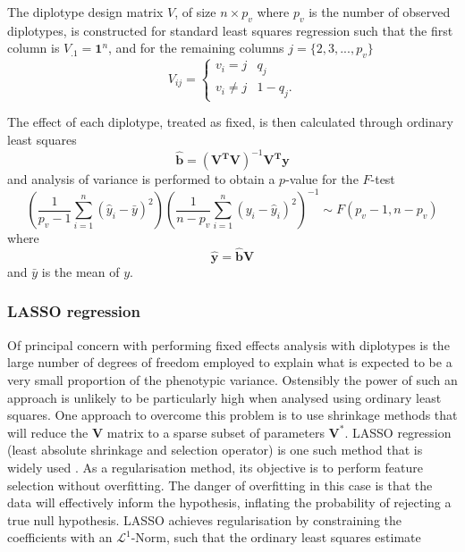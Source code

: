 The diplotype design matrix $V$, of size $n \times p_{v}$ where $p_{v}$ is the number of observed diplotypes, is constructed for standard least squares regression such that the first column is $V_{.1} = \mathbf{1}^n$, and for the remaining columns $j = \{2, 3, ..., p_{v}\}$
\begin{equation}
V_{ij} = \left\{
\begin{array}{ll}
v_{i} = j & q_{j} \\
v_{i} \neq j & 1 - q_{j}.
\end{array}\right.
\end{equation}

The effect of each diplotype, treated as fixed, is then calculated through ordinary least squares
\begin{equation}
\mathbf{\hat{b}} = (\mathbf{V^{T}V})^{-1}\mathbf{V^{T}y}
\end{equation}
and analysis of variance is performed to obtain a $p$-value for the $F$-test
\begin{equation}
\left (
  \frac{1}{p_{v} - 1} \sum^{n}_{i = 1} (\hat{y}_{i} - \bar{y})^{2} 
\right )
\left (
  \frac{1} {n - p_{v}} \sum^{n}_{i = 1} (y_{i} - \hat{y}_{i})^{2}
\right )^{-1}
\sim F(p_{v}-1, n - p_{v})
\label{eq:ftest}
\end{equation}
where
\begin{equation}
\mathbf{\hat{y}} = \mathbf{\hat{b}V}
\end{equation}
and $\bar{y}$ is the mean of $y$.


\subsubsection{LASSO regression}
\label{sec:dip_lasso}

Of principal concern with performing fixed effects analysis with diplotypes is the large number of degrees of freedom employed to explain what is expected to be a very small proportion of the phenotypic variance. Ostensibly the power of such an approach is unlikely to be particularly high when analysed using ordinary least squares. One approach to overcome this problem is to use shrinkage methods that will reduce the $\mathbf{V}$ matrix to a sparse subset of parameters $\mathbf{V^{*}}$. LASSO regression (least absolute shrinkage and selection operator) is one such method that is widely used \citep{Tibshirani1996}. As a regularisation method, its objective is to perform feature selection without overfitting. The danger of overfitting in this case is that the data will effectively inform the hypothesis, inflating the probability of rejecting a true null hypothesis. LASSO achieves regularisation by constraining the coefficients with an $\mathcal{L}^{1}$-Norm, such that the ordinary least squares estimate

